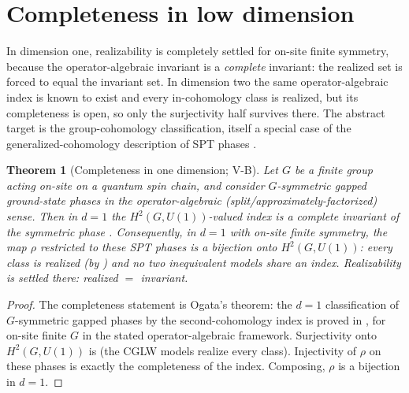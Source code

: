 \documentclass[12pt]{article}
\newcommand{\real}{\rho}                         %
\newtheorem{theorem}{Theorem}[section]
\theoremstyle{definition}
\theoremstyle{remark}
\begin{document}
\section{Completeness in low dimension}
\label{sec:complete}

In dimension one, realizability is completely settled for on-site finite symmetry, because the
operator-algebraic invariant is a \emph{complete} invariant: the realized set is forced to
equal the invariant set. In dimension two the same operator-algebraic index is known to exist
and every in-cohomology class is realized, but its completeness is open, so only the
surjectivity half survives there. The abstract target is the group-cohomology classification,
itself a special case of the generalized-cohomology description of SPT phases
\cite{gaiotto-jf,xiong-minimalist}.

\begin{theorem}[Completeness in one dimension; V-B]
\label{thm:VB}
Let $G$ be a finite group acting on-site on a quantum spin chain, and consider $G$-symmetric
gapped ground-state phases in the operator-algebraic (split/approximately-factorized) sense.
Then in $d=1$ the $H^2(G,U(1))$-valued index is a \emph{complete} invariant of the symmetric
phase \cite{ogata-spt-chains,ogata-classification-review}. Consequently, in $d=1$ with
on-site finite symmetry, the map $\real$ restricted to these SPT phases is a \emph{bijection}
onto $H^2(G,U(1))$: every class is realized (by ) and no two inequivalent models
share an index. Realizability is settled there: realized $=$ invariant.
\end{theorem}

\begin{proof}
The completeness statement is Ogata's theorem: the $d=1$ classification of $G$-symmetric
gapped phases by the second-cohomology index is proved in
\cite{ogata-spt-chains,ogata-classification-review}, for on-site finite $G$ in the stated
operator-algebraic framework. Surjectivity onto $H^2(G,U(1))$ is  (the CGLW
models realize every class). Injectivity of $\real$ on these phases is exactly the
completeness of the index. Composing, $\real$ is a bijection in $d=1$.
\end{proof}
\end{document}
